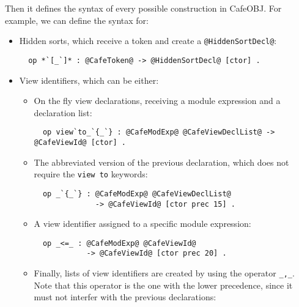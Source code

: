 Then it defines the syntax of every possible construction in CafeOBJ. For example,
we can define the syntax for:
\begin{itemize}
\item
Hidden sorts, which receive a token and create a \verb"@HiddenSortDecl@":

{\codesize
\begin{verbatim}
  op *`[_`]* : @CafeToken@ -> @HiddenSortDecl@ [ctor] .
\end{verbatim}
}

{\codesize
\begin{comment}
  *** cafe module expressions !!!!
  *** op _+_ : @CafeModExp@ @CafeModExp@ -> @CafeModExp@ [ctor assoc prec 42] .
  op _`(_`) : @CafeModExp@ @CafeViewId@ -> @CafeModExp@ [ctor prec 40] .
  op _*`{_`} : @CafeModExp@ @CafeViewDeclList@ -> @CafeModExp@ [ctor prec 43] .
\end{comment}
}

\item
View identifiers, which can be either:
\begin{itemize}
\item
On the fly view declarations, receiving a module expression and a declaration
list:

{\codesize
\begin{verbatim}
  op view`to_`{_`} : @CafeModExp@ @CafeViewDeclList@ -> @CafeViewId@ [ctor] .
\end{verbatim}
}

\item
The abbreviated version of the previous declaration, which does not require the
\verb"view to" keywords:

{\codesize
\begin{verbatim}
  op _`{_`} : @CafeModExp@ @CafeViewDeclList@
              -> @CafeViewId@ [ctor prec 15] .
\end{verbatim}
}

\item
A view identifier assigned to a specific module expression:

{\codesize
\begin{verbatim}
  op _<=_ : @CafeModExp@ @CafeViewId@
            -> @CafeViewId@ [ctor prec 20] .
\end{verbatim}
}

\item
Finally, lists of view identifiers are created by using the operator \verb"_,_".
Note that this operator is the one with the lower precedence, since it must not
interfer with the previous declarations:


\end{itemize}
\end{itemize}
